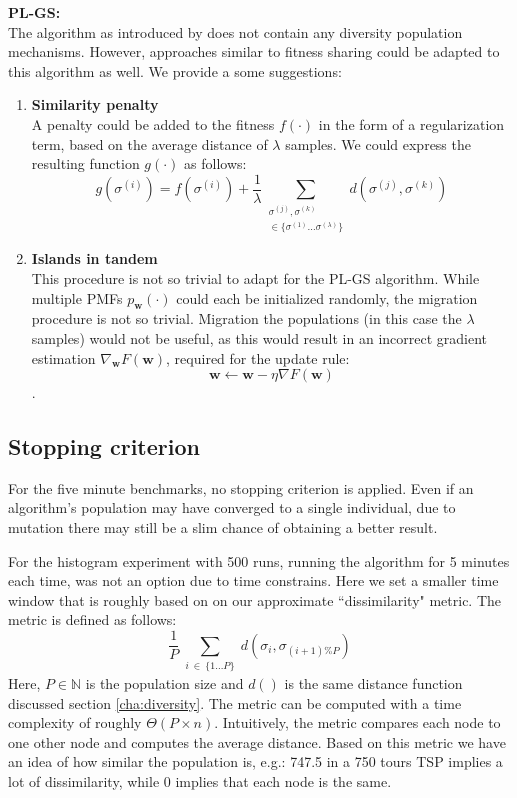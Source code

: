 \documentclass[a4paper,10pt]{article}
\begin{document}
	\textbf{PL-GS:} \\
	The algorithm as introduced by \citeauthor{santucci_gradient_2020} does not contain any diversity population mechanisms. However, approaches similar to fitness sharing could be adapted to this algorithm as well. We provide a some suggestions:
	\begin{enumerate}
		\item \textbf{Similarity penalty} \\ 
		A penalty could be added to the fitness $f(\cdot)$ in the form of a regularization term, based on the average distance of $\lambda$ samples. We could express the resulting function $g(\cdot)$ as follows:
		$$
		g(\sigma^{(i)}) = f(\sigma^{(i)}) + \frac{1}{\lambda} \sum_{\substack{\sigma^{(j)}, \sigma^{(k)} \\ \in \{ \sigma^{(1)} \dots \sigma^{(\lambda)} \}}} d(\sigma^{(j)}, \sigma^{(k)})
		$$
		\item \textbf{Islands in tandem} \\
		This procedure is not so trivial to adapt for the PL-GS algorithm. While multiple PMFs $p_\mathbf{w}(\cdot)$ could each be initialized randomly, the migration procedure is not so trivial. Migration the populations (in this case the $\lambda$ samples) would not be useful, as this would result in an incorrect gradient estimation $\nabla_{\mathbf{w}} F\left(\mathbf{w}\right)$, required for the update rule:
		$$\mathbf{w} \leftarrow \mathbf{w} - \eta \nabla F\left(\mathbf{w}\right)$$.
		
		
	\end{enumerate}
	


\subsection{Stopping criterion}
For the five minute benchmarks, no stopping criterion is applied. Even if an algorithm's population may have converged to a single individual, due to mutation there may still be a slim chance of obtaining a better result. 

For the histogram experiment with 500 runs, running the algorithm for 5 minutes each time, was not an option due to time constrains. Here we set a smaller time window that is roughly based on on our approximate ``dissimilarity" metric. The metric is defined as follows:
$$
\frac{1}{P} \sum_{\substack{i~\in~\{1 \dots P \}}} d(\sigma_i, \sigma_{(i+1) \% P})
$$
Here, $P \in \mathbb{N}$ is the population size and $d()$ is the same distance function discussed section \ref{cha:diversity}. The metric can be computed with a time complexity of roughly $\Theta(P \times n)$.
Intuitively, the metric compares each node to one other node and computes the average distance. Based on this metric we have an idea of how similar the population is, e.g.: 747.5 in a 750 tours TSP implies a lot of dissimilarity, while 0 implies that each node is the same.
\end{document}
